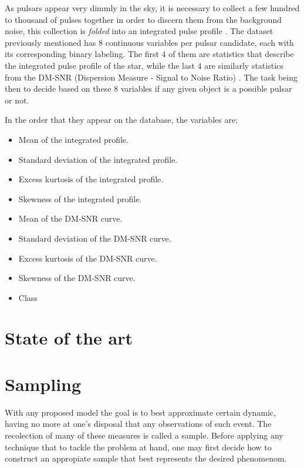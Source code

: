 \documentclass[conference]{IEEEtran}
\begin{document}
As pulsars appear very dimmly in the sky, it is necessary to collect a few hundred
to thousand of pulses together in order to discern them from the background noise,
this collection is \textit{folded} into an integrated pulse profile
\cite{pulsar:importance:kramer}. The dataset previously mentioned
has 8 continuous variables per pulsar candidate, each with its corresponding
binary labeling. The first $4$ of them are statistics that describe the
integrated pulse profile of the star, while the last $4$ are similarly
statistics from the DM-SNR (Dispersion Measure - Signal to Noise Ratio)
\cite{pulsar:dataset:explanation:lyon}. The task being then to decide based
on these 8 variables if any given object is a possible pulsar or not.

In the order that they appear on the database, the variables are:

\begin{itemize}
    \item Mean of the integrated profile.
    \item Standard deviation of the integrated profile.
    \item Excess kurtosis of the integrated profile.
    \item Skewness of the integrated profile.
    \item Mean of the DM-SNR curve.
    \item Standard deviation of the DM-SNR curve.
    \item Excess kurtosis of the DM-SNR curve.
    \item Skewness of the DM-SNR curve.
    \item Class 
\end{itemize}


\section{State of the art\label{sec:state_of_art}}

\todo{}

\section{Sampling\label{sec:sample}}

With any proposed model the goal is to best approximate certain dynamic,
having no more at one's disposal that any observations of such event. The recolection
of many of these measures is called a sample. 
Before applying any technique that to tackle the problem at hand, one may
first decide how to construct an appropiate sample that best represents the
desired phenomenom.
\end{document}
